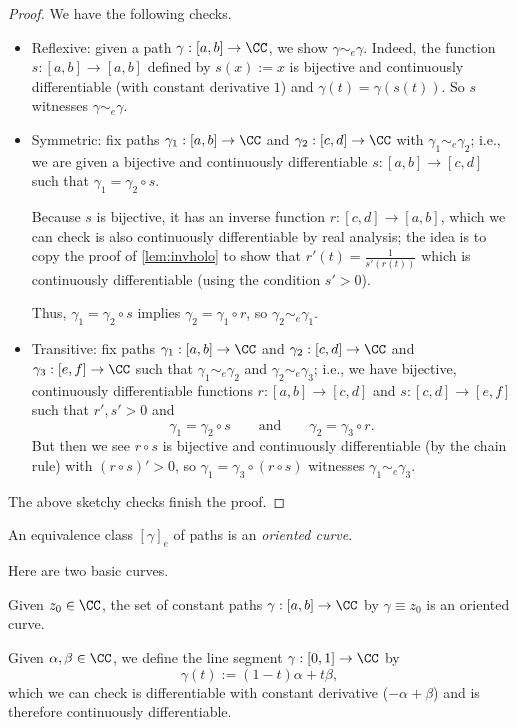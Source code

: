 \begin{proof}
	We have the following checks.
	\begin{itemize}
		\item Reflexive: given a path $\gamma:[a,b]\to\CC$, we show $\gamma\sim_e\gamma$. Indeed, the function $s:[a,b]\to[a,b]$ defined by $s(x):=x$ is bijective and continuously differentiable (with constant derivative $1$) and $\gamma(t)=\gamma(s(t))$. So $s$ witnesses $\gamma\sim_e\gamma$.
		\item Symmetric: fix paths $\gamma_1:[a,b]\to\CC$ and $\gamma_2:[c,d]\to\CC$ with $\gamma_1\sim_e\gamma_2$; i.e., we are given a bijective and continuously differentiable $s:[a,b]\to[c,d]$ such that $\gamma_1=\gamma_2\circ s$.

		Because $s$ is bijective, it has an inverse function $r:[c,d]\to[a,b]$, which we can check is also continuously differentiable by real analysis; the idea is to copy the proof of \autoref{lem:invholo} to show that $r'(t)=\frac1{s'(r(t))}$ which is continuously differentiable (using the condition $s'>0$).

		Thus, $\gamma_1=\gamma_2\circ s$ implies $\gamma_2=\gamma_1\circ r$, so $\gamma_2\sim_e\gamma_1$.

		\item Transitive: fix paths $\gamma_1:[a,b]\to\CC$ and $\gamma_2:[c,d]\to\CC$ and $\gamma_3:[e,f]\to\CC$ such that $\gamma_1\sim_e\gamma_2$ and $\gamma_2\sim_e\gamma_3$; i.e., we have bijective, continuously differentiable functions $r:[a,b]\to[c,d]$ and $s:[c,d]\to[e,f]$ such that $r',s'>0$ and
		\[\gamma_1=\gamma_2\circ s\qquad\text{and}\qquad\gamma_2=\gamma_3\circ r.\]
		But then we see $r\circ s$ is bijective and continuously differentiable (by the chain rule) with $(r\circ s)'>0$, so $\gamma_1=\gamma_3\circ(r\circ s)$ witnesses $\gamma_1\sim_e\gamma_3$.
	\end{itemize}
	The above sketchy checks finish the proof.
\end{proof}
\begin{definition}
	An equivalence class $[\gamma]_e$ of paths is an \textit{oriented curve}.
\end{definition}
Here are two basic curves.
\begin{example}
	Given $z_0\in\CC$, the set of constant paths $\gamma:[a,b]\to\CC$ by $\gamma\equiv z_0$ is an oriented curve.
\end{example}
\begin{example}
	Given $\alpha,\beta\in\CC$, we define the line segment $\gamma:[0,1]\to\CC$ by
	\[\gamma(t):=(1-t)\alpha+t\beta,\]
	which we can check is differentiable with constant derivative ($-\alpha+\beta$) and is therefore continuously differentiable.
\end{example}
